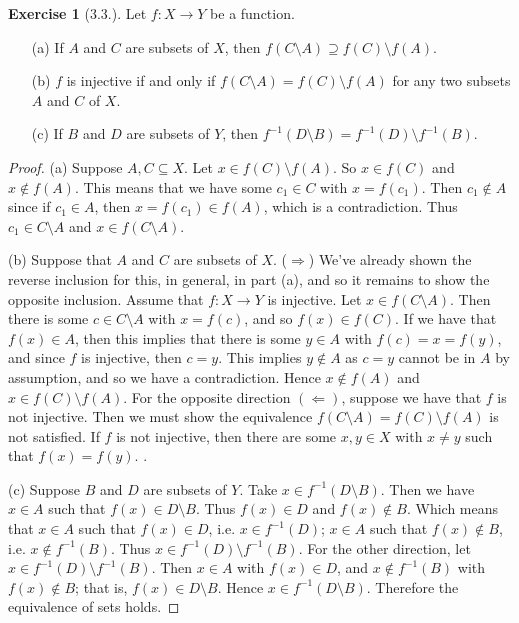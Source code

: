 \documentclass[9pt,reqno]{amsart}
\theoremstyle{definition}
\newtheorem{exercise}{Exercise}[section]
\begin{document}
\begin{exercise}[3.3.] Let $f \colon X \to Y$ be a function.
\begin{itemize}
	\item [(a)] If $A$ and $C$ are subsets of $X$, then $f(C \setminus A) \supseteq f(C) \setminus f(A)$. 
	\item [(b)] $f$ is injective if and only if $f(C\setminus A) = f(C) \setminus f(A)$ for any two subsets $A$ and $C$ of $X$. 
	\item [(c)] If $B$ and $D$ are subsets of $Y$, then $f^{-1} (D\setminus B) = f^{-1} (D) \setminus f^{-1} (B)$. 
\end{itemize}
\end{exercise}
\begin{proof}
	(a) Suppose $A, C \subseteq X$. Let $x \in f(C) \setminus f(A)$. So $x \in f(C)$ and $x \notin f(A)$. This means that we have some $c_1 \in C$ with $x = f(c_1)$. Then $c_1 \notin A$ since if $c_1 \in A$, then $x = f(c_1) \in f(A)$, which is a contradiction. Thus $c_1 \in C \setminus A$  and $x \in f(C \setminus A)$. 

			
	(b) Suppose that $A$ and $C$ are subsets of $X$. ($\Rightarrow$) We've already shown the reverse inclusion for this, in general, in part (a), and so it remains to show the opposite inclusion.  Assume that $f \colon X \to Y$ is injective. Let $x \in f(C \setminus A)$. Then there is some $c \in C \setminus A$ with $x = f(c)$, and so $f(x) \in f(C)$. If we have that $f(x) \in A$, then this implies that there is some $y \in A$ with $f(c) = x = f(y)$, and since $f$ is injective, then $c=y$. This implies $y \notin A$ as $c=y$ cannot be in $A$ by assumption, and so we have a contradiction. Hence $x \notin f(A)$ and $x \in f(C) \setminus f(A)$. For the opposite direction $(\Leftarrow)$, suppose we have that $f$ is not injective. Then we must show the equivalence $f(C\setminus A) = f(C) \setminus f(A)$ is not satisfied. If $f$ is not injective, then there are some $x, y \in X$ with $x \neq y$ such that $f(x) = f(y)$. 
	.
	
	(c) Suppose $B$ and $D$ are subsets of $Y$. Take $x \in f^{-1} (D\setminus B)$. Then we have $x \in A$ such that $f(x) \in D \setminus B$. Thus $f(x) \in D$ and $f(x) \notin B$. Which means that $x \in A$ such that $f(x) \in D$, i.e. $x \in f^{-1} (D)$; $x \in A$ such that $f(x) \notin B$, i.e. $x \notin f^{-1} (B)$. Thus $x \in f^{-1} (D) \setminus f^{-1} (B)$. For the other direction, let $ x \in f^{-1} (D) \setminus f^{-1} (B)$. Then $x  \in A$ with $f(x) \in D$, and $x \notin f^{-1} (B)$ with $f(x) \notin B$; that is, $f(x) \in D \setminus B$. Hence $x \in f^{-1} (D \setminus B)$. Therefore the equivalence of sets holds. 
\end{proof}
\end{document}
